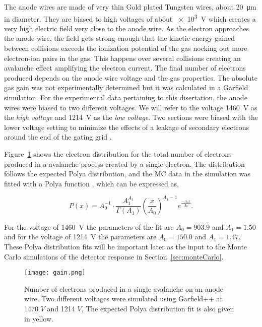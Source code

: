 The anode wires are made of very thin Gold plated Tungsten wires, about \SI{20}{\micro\metre} in diameter. They are biased to high voltages of about  \SI{e3}{\volt} which creates a very high electric field very close to the anode wire. As the electron approaches the anode wire, the field gets strong enough that the kinetic energy gained between collisions exceeds the ionization potential of the gas nocking out more electron-ion pairs in the gas. This happens over several collisions creating an avalanche effect amplifying the electron current.  The final number of electrons produced depends on the anode wire voltage and the gas properties. The absolute gas gain was not experimentally determined but it was calculated in a Garfield simulation. For the experimental data pertaining to this disertation, the anode wires were biased to two different voltages. We will refer to the voltage \SI{1460}{\volt} as the \emph{high voltage} and \SI{1214}{\volt} as the \emph{low voltage}. Two sections were biased with the lower voltage setting to minimize the effects of a leakage of secondary electrons around the end of the gating grid \cite{jon}.


 Figure~\ref{fig:anodegain} shows the electron distribution for the total number of electrons produced in a avalanche process created by a single electron. The distribution follows the expected Polya distribution, and the MC data in the simulation was fitted with a Polya function \cite{blumrol}, which can be expressed as,

\begin{equation}
P(x) = A_0^{-1}\cdot \frac{A_1^{A_1}}{\Gamma(A_1)} \left(\frac{x}{A_0}\right)^{A_1-1}e^{\frac{-A_1x}{A_0}}.
\end{equation}

For the voltage of \SI{1460}{\volt} the parameters of the fit are $A_0=903.9$ and $A_1=1.50$ and for the voltage of \SI{1214}{\volt} the parameters are $A_0=150.0$ and $A_1=1.47$. These Polya distribution fits will be important later as the input to the Monte Carlo simulations of the detector response in Section~\ref{sec:monteCarlo}.



\begin{figure}[!htb]
\texttt{[image: gain.png]}
\caption{Number of electrons produced in a single avalanche on an anode wire. Two different voltages were simulated using Garfield++ at 1470 $V$ and 1214 $V$. The expected Polya distribution fit is also given in yellow.}
\label{fig:anodegain}
\end{figure}



